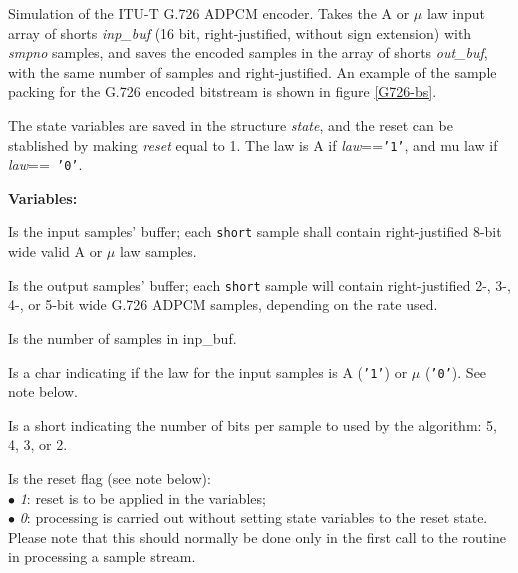         Simulation of the ITU-T G.726 ADPCM encoder. Takes the A or
        $\mu$ law input array of shorts {\em inp\_buf} (16 bit,
        right-justified, without sign extension) with {\em smpno}
        samples, and saves the encoded samples in the array of shorts
        {\em out\_buf}, with the same number of samples and
        right-justified. An example of the sample packing for the
        G.726 encoded bitstream is shown in figure \ref{G726-bs}.

        The state variables are saved in the structure {\em state}, and the
        reset can be stablished by making {\em reset} equal to 1. The law
        is A if {\em law}=={\tt '1'}, and mu law if {\em law}=={\tt
        '0'}.

{\bf Variables: }
\begin{Descr}{\DescrLen}
\item[\pbox{20mm}{\em inp\_buf}] %
               Is the input samples' buffer; each {\tt short} sample
               shall contain right-justified 8-bit wide valid A or $\mu$
               law samples.

\item[\pbox{20mm}{\em out\_buf}] %
               Is the output samples' buffer; each {\tt short} sample
               will contain right-justified 2-, 3-, 4-, or 5-bit wide G.726
               ADPCM samples, depending on the rate used.

\item[\pbox{20mm}{\em smpno}] %
               Is the number of samples in inp\_buf.

\item[\pbox{20mm}{\em law}] %
               Is a char indicating if the law for the input samples is A
               ({\tt '1'}) or $\mu$ ({\tt '0'}). See note below.

\item[\pbox{20mm}{\em rate}] %
               Is a short indicating the number of bits per sample to used by
               the algorithm: 5, 4, 3, or 2.

\item[\pbox{20mm}{\em reset}] %
               Is the reset flag (see note below):\\
               $\bullet$ {\em 1}: reset is to be applied in the variables;\\
               $\bullet$ {\em 0}: processing is carried out without
               setting state variables to the reset state. \\
               Please note that this should normally be
               done only in the first call to the routine in processing a
               sample stream.


\end{Descr}
